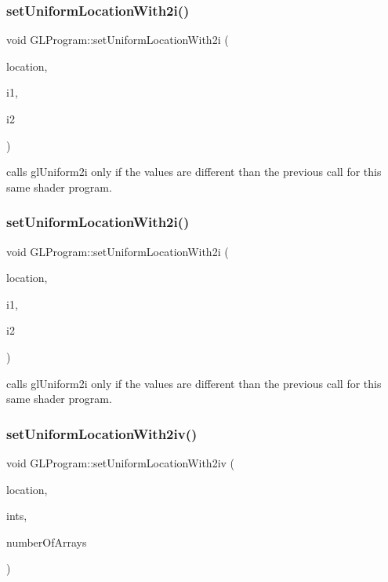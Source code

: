 \subsubsection{\texorpdfstring{set\+Uniform\+Location\+With2i()}{setUniformLocationWith2i()}\hspace{0.1cm}{\footnotesize\ttfamily [1/2]}}
{\footnotesize\ttfamily void G\+L\+Program\+::set\+Uniform\+Location\+With2i (\begin{DoxyParamCaption}\item[{G\+Lint}]{location,  }\item[{G\+Lint}]{i1,  }\item[{G\+Lint}]{i2 }\end{DoxyParamCaption})}

calls gl\+Uniform2i only if the values are different than the previous call for this same shader program. \mbox{\label{classGLProgram_abefc77093c5e21dfdf7e0c71bed024c6}} 
\subsubsection{\texorpdfstring{set\+Uniform\+Location\+With2i()}{setUniformLocationWith2i()}\hspace{0.1cm}{\footnotesize\ttfamily [2/2]}}
{\footnotesize\ttfamily void G\+L\+Program\+::set\+Uniform\+Location\+With2i (\begin{DoxyParamCaption}\item[{G\+Lint}]{location,  }\item[{G\+Lint}]{i1,  }\item[{G\+Lint}]{i2 }\end{DoxyParamCaption})}

calls gl\+Uniform2i only if the values are different than the previous call for this same shader program. \mbox{\label{classGLProgram_ae367303d8a685968a2c94ddc26ca2136}} 
\subsubsection{\texorpdfstring{set\+Uniform\+Location\+With2iv()}{setUniformLocationWith2iv()}\hspace{0.1cm}{\footnotesize\ttfamily [1/2]}}
{\footnotesize\ttfamily void G\+L\+Program\+::set\+Uniform\+Location\+With2iv (\begin{DoxyParamCaption}\item[{G\+Lint}]{location,  }\item[{G\+Lint $\ast$}]{ints,  }\item[{unsigned int}]{number\+Of\+Arrays }\end{DoxyParamCaption})}

